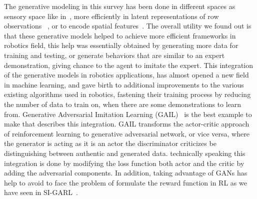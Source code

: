 The generative modeling in this survey has been done in different spaces as sensory space like in~\cite{nair2018visual}, more efficiently in latent representations of row observations~\cite{fujimoto2018addressing} , or to encode spatial features~\cite{finn2016deep}. The overall utility we found out is that these generative models helped to achieve more efficient frameworks in robotics field, this help was essentially obtained by generating more data for training and testing, or generate behaviors that are similar to an expert demonstration, giving chance to the agent to imitate the expert. This integration of the generative models in robotics applications, has almost opened a new field in machine learning, and gave birth to additional improvements to the various existing algorithms used in robotics, fastening their training process by reducing the number of data to train on, when there are some demonstrations to learn from. Generative Adversarial Imitation Learning (GAIL)~\cite{DBLP:journals/corr/HoE16} is the best example to make that describes this integration. GAIL transforms the actor-critic approach of reinforcement learning to generative adversarial network, or vice versa, where the generator is acting as it is an actor the discriminator criticizes be distinguishing between authentic and generated data. technically speaking this integration is done by modifying the loss function both actor and the critic by adding the adversarial components. In addition, taking advantage of GANs has help to avoid to face the problem of formulate the reward function in RL as we have seen in SI-GARL~\cite{liu2019self}.\\
